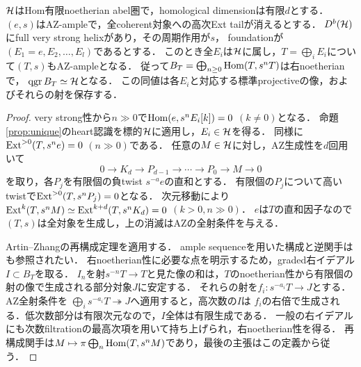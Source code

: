 \begin{proposition}[ample構造対象を含むhelix]\label{prop:ample-helix-noetherian}
$\mathcal H$はHom有限noetherian abel圏で，homological dimensionは有限$d$とする．
$(e,s)$はAZ-ampleで，全coherent対象への高次Ext tailが消えるとする．
$D^b(\mathcal H)$にfull very strong helixがあり，その周期作用が$s$，
foundationが$(E_1=e,E_2,\ldots,E_l)$であるとする．
このとき全$E_i$は$\mathcal H$に属し，$T=\bigoplus_iE_i$について$(T,s)$もAZ-ampleとなる．
従って$B_T=\bigoplus_{n\ge0}\operatorname{Hom}(T,s^nT)$は右noetherianで，
$\operatorname{qgr} B_T\simeq\mathcal H$となる．
この同値は各$E_i$と対応する標準projectiveの像，およびそれらの射を保存する．
\end{proposition}
\begin{proof}
very strong性から$n\gg0$で$\operatorname{Hom}(e,s^nE_i[k])=0$ $(k\ne0)$となる．
命題\ref{prop:unique}のheart認識を標的$\mathcal H$に適用し，$E_i\in\mathcal H$を得る．
同様に$\operatorname{Ext}^{>0}(T,s^ne)=0$ $(n\gg0)$である．
任意の$M\in\mathcal H$に対し，AZ生成性を$d$回用いて
\[
 0\to K_d\to P_{d-1}\to\cdots\to P_0\to M\to0
\]
を取り，各$P_j$を有限個の負twist $s^{-a}e$の直和とする．
有限個の$P_j$について高いtwistで$\operatorname{Ext}^{>0}(T,s^nP_j)=0$となる．
次元移動により
$\operatorname{Ext}^k(T,s^nM)\simeq\operatorname{Ext}^{k+d}(T,s^nK_d)=0$ $(k>0,n\gg0)$．
$e$は$T$の直和因子なので$(T,s)$は全対象を生成し，上の消滅はAZの全射条件を与える．

Artin--Zhangの再構成定理\cite[Theorem 4.5]{AZ}を適用する．
ample sequenceを用いた構成と逆関手は\cite[Theorem 2.4]{PolishchukProj}も参照されたい．
右noetherian性に必要な点を明示するため，graded右イデアル$I\subset B_T$を取る．
$I_n$を射$s^{-n}T\to T$と見た像の和は，$T$のnoetherian性から有限個の射の像で生成される部分対象$J$に安定する．
それらの射を$f_i:s^{-a_i}T\to J$とする．AZ全射条件を
$\bigoplus_i s^{-a_i}T\twoheadrightarrow J$へ適用すると，高次数の$I$は
$f_i$の右倍で生成される．低次数部分は有限次元なので，$I$全体は有限生成である．
一般の右イデアルにも次数filtrationの最高次項を用いて持ち上げられ，右noetherian性を得る．
再構成関手は$M\mapsto\pi\bigoplus_n\operatorname{Hom}(T,s^nM)$であり，最後の主張はこの定義から従う．
\end{proof}

